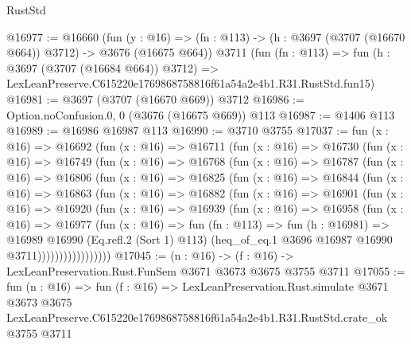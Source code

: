 \begin{lexlean}{RustStd}
\begin{coremodule}
@16977 := @16660
    (fun (y : @16) => (fn : @113) -> (h : @3697 (@3707 (@16670 @664)) @3712) -> @3676 (@16675 @664))
    @3711
    (fun (fn : @113) =>
    fun (h : @3697 (@3707 (@16684 @664)) @3712) =>
    LexLeanPreserve.C615220e1769868758816f61a54a2e4b1.R31.RustStd.fun15)
@16981 := @3697 (@3707 (@16670 @669)) @3712
@16986 := Option.noConfusion.{0, 0} (@3676 (@16675 @669)) @113
@16987 := @1406 @113
@16989 := @16986 @16987 @113
@16990 := @3710 @3755
@17037 := fun (x : @16) =>
  @16692
    (fun (x : @16) =>
    @16711
      (fun (x : @16) =>
      @16730
        (fun (x : @16) =>
        @16749
          (fun (x : @16) =>
          @16768
            (fun (x : @16) =>
            @16787
              (fun (x : @16) =>
              @16806
                (fun (x : @16) =>
                @16825
                  (fun (x : @16) =>
                  @16844
                    (fun (x : @16) =>
                    @16863
                      (fun (x : @16) =>
                      @16882
                        (fun (x : @16) =>
                        @16901
                          (fun (x : @16) =>
                          @16920
                            (fun (x : @16) =>
                            @16939
                              (fun (x : @16) =>
                              @16958
                                (fun (x : @16) =>
                                @16977
                                  (fun (x : @16) =>
                                  fun (fn : @113) =>
                                  fun (h : @16981) =>
                                  @16989
                                    @16990
                                    (Eq.refl.{2} (Sort 1) @113)
                                    (heq_of_eq.{1} @3696 @16987 @16990 @3711)))))))))))))))))
@17045 := (n : @16) -> (f : @16) -> LexLeanPreservation.Rust.FunSem @3671 @3673 @3675 @3755 @3711
@17055 := fun (n : @16) =>
  fun (f : @16) =>
  LexLeanPreservation.Rust.simulate
    @3671
    @3673
    @3675
    LexLeanPreserve.C615220e1769868758816f61a54a2e4b1.R31.RustStd.crate_ok
    @3755
    @3711
\end{coremodule}
\end{lexlean}
